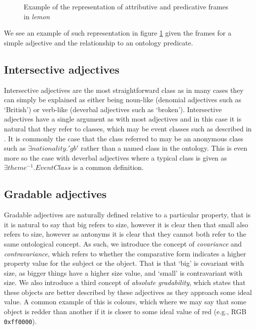 \documentclass[11pt]{article}
\begin{document}
\begin{figure}
\caption{\label{attr-pred-example}Example of the representation of attributive and predicative frames in \emph{lemon}}
\end{figure}

We see an example of such representation in figure \ref{attr-pred-example} given the frames for a simple adjective and the relationship to an ontology predicate.

\subsection{Intersective adjectives}

Intersective adjectives are the most straightforward class as in many cases they can simply be explained as either being noun-like (denomial adjectives such as `British') or verb-like (deverbal adjectives such as `broken'). Intersective adjectives have a single argument as with most adjectives and in this case it is natural that they refer to classes, which may be event classes such as described in \cite{}. It is commonly the case that the class referred to may be an anonymous class such as $\exists nationality.'gb'$ rather than a named class in the ontology. This is even more so the case with deverbal adjectives where a typical class is given as $\exists theme^{-1}.EventClass$ is a common definition.

\subsection{Gradable adjectives}

Gradable adjectives are naturally defined relative to a particular property, that is it is natural to say that big refers to size, however it is clear then that small also refers to size, however as antonyms it is clear that they cannot both refer to the same ontological concept. As such, we introduce the concept of \emph{covariance} and \emph{contravariance}, which refers to whether the comparative form indicates a higher property value for the subject or the object. That is that `big' is covariant with size, as bigger things have a higher size value, and `small' is contravariant with size. We also introduce a third concept of \emph{absolute gradability}, which states that these objects are better described by these adjectives as they approach some ideal value. A common example of this is colours, which where we may say that some object is redder than another if it is closer to some ideal value of red (e.g., RGB {\tt 0xff0000}). 
\end{document}

